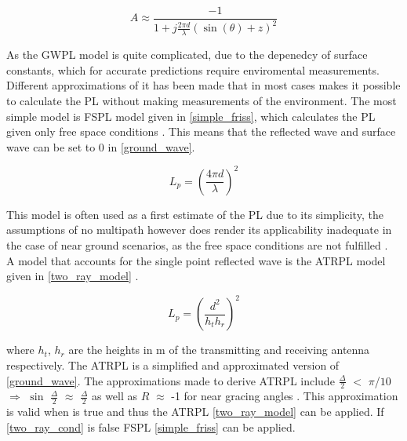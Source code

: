 \begin{equation}
A \approx \frac{-1}{1+j\frac{2\pi d}{\lambda}(\sin(\theta)+z)^{2}}
\label{attenuation_factor_A}
\end{equation}


As the GWPL model is quite complicated, due to the depenedcy of surface constants, which for accurate predictions require enviromental measurements. Different approximations of it has been made that in most cases makes it possible to calculate the PL without making measurements of the environment. The most simple model is FSPL model given in \eqref{simple_friss}, which calculates the PL given only free space conditions \cite{Chong}. This means that the reflected wave and surface wave can be set to 0 in \eqref{ground_wave}. 

\begin{equation}
L_p=\left(\frac{4 \pi d}{\lambda}\right)^2
\label{simple_friss}
\end{equation}

This model is often used as a first estimate of the PL due to its simplicity, the assumptions of no multipath however does render its applicability inadequate in the case of near ground scenarios, as the free space conditions are not fulfilled \cite{two_ray}. \\



A model that accounts for the single point reflected wave is the ATRPL model given in \eqref{two_ray_model} \cite{two_ray, Chong}. 

\begin{equation}
L_{p} = \left(\frac{d^2}{h_t h_r}\right)^2
\label{two_ray_model}
\end{equation}

where $h_t$, $h_r$ are the heights in m of the transmitting and receiving antenna respectively. 
The ATRPL is a simplified and approximated version of \eqref{ground_wave}. The approximations made to derive ATRPL include $\frac{\Delta}{2}$ $<$ $\pi$/$10$ $\Rightarrow$ $\sin$ $\frac{\Delta}{2}$ $\approx$ $\frac{\Delta}{2}$ as well as $R$ $\approx$ -1 for near gracing angles \cite{Chong}. This approximation is valid when is true and thus the ATRPL \eqref{two_ray_model} can be applied. If \eqref{two_ray_cond} is false FSPL \eqref{simple_friss} can be applied.
  
